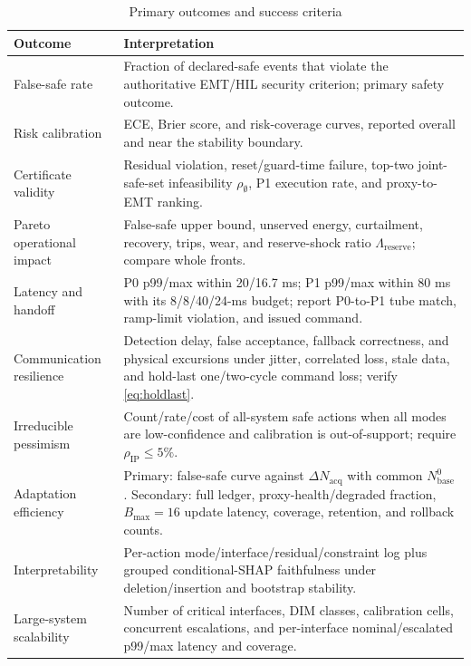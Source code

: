 \documentclass[conference]{IEEEtran}
\begin{document}
\begin{table}[t]
\caption{Primary outcomes and success criteria}
\label{tab:metrics}
\centering
\footnotesize
\begin{tabular}{p{} p{}}
\hline
\textbf{Outcome} & \textbf{Interpretation}\\
\hline
False-safe rate & Fraction of declared-safe events that violate the authoritative EMT/HIL security criterion; primary safety outcome.\\
Risk calibration & ECE, Brier score, and risk-coverage curves, reported overall and near the stability boundary.\\
Certificate validity & Residual violation, reset/guard-time failure, top-two joint-safe-set infeasibility $\rho_{\emptyset}$, P1 execution rate, and proxy-to-EMT ranking.\\
Pareto operational impact & False-safe upper bound, unserved energy, curtailment, recovery, trips, wear, and reserve-shock ratio $\Lambda_{\mathrm{reserve}}$; compare whole fronts.\\
Latency and handoff & P0 p99/max within 20/16.7 ms; P1 p99/max within 80 ms with its 8/8/40/24-ms budget; report P0-to-P1 tube match, ramp-limit violation, and issued command.\\
Communication resilience & Detection delay, false acceptance, fallback correctness, and physical excursions under jitter, correlated loss, stale data, and hold-last one/two-cycle command loss; verify \eqref{eq:holdlast}.\\
Irreducible pessimism & Count/rate/cost of all-system safe actions when all modes are low-confidence and calibration is out-of-support; require $\rho_{\mathrm{IP}}\leq5\%$.\\
Adaptation efficiency & Primary: false-safe curve against $\Delta N_{\mathrm{acq}}$ with common $N_{\mathrm{base}}^{0}$. Secondary: full ledger, proxy-health/degraded fraction, $B_{\max}=16$ update latency, coverage, retention, and rollback counts.\\
Interpretability & Per-action mode/interface/residual/constraint log plus grouped conditional-SHAP faithfulness under deletion/insertion and bootstrap stability.\\
Large-system scalability & Number of critical interfaces, DIM classes, calibration cells, concurrent escalations, and per-interface nominal/escalated p99/max latency and coverage.\\
\hline
\end{tabular}
\end{table}
\end{document}
